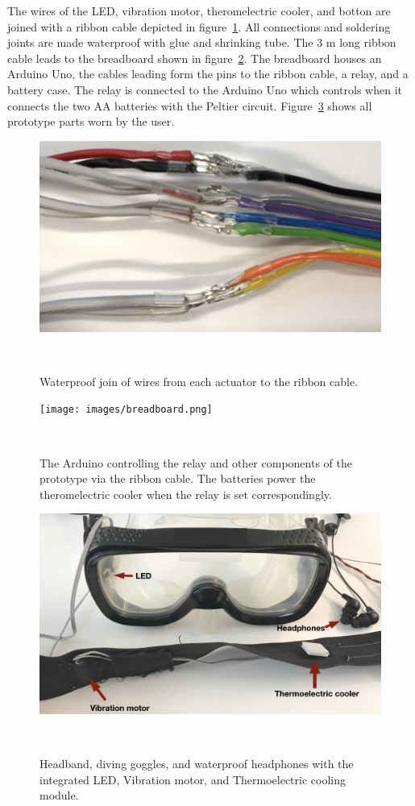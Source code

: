 The wires of the LED, vibration motor, theromelectric cooler, and botton are joined with a ribbon cable depicted in figure~\ref{fig:wires}.
All connections and soldering joints are made waterproof with glue and shrinking tube.
The  3 m long ribbon cable leads to the breadboard shown in figure~\ref{fig:breadboard}.
The breadboard houses an Arduino Uno, the cables leading form the pins to the ribbon cable, a relay, and a battery case.
The relay is connected to the Arduino Uno  which controls when it connects the two AA batteries with the Peltier circuit.
Figure~\ref{fig:studysetupcut} shows all prototype parts worn by the user.

\begin{figure}
	\includegraphics[width= \textwidth]{images/wires.png}
	\caption{Waterproof join of wires from each actuator to the ribbon cable.}~\label{fig:wires}
\end{figure}

\begin{figure}
	\texttt{[image: images/breadboard.png]}
	\caption{The Arduino controlling the relay and other components of the prototype via the ribbon cable. The batteries power the theromelectric cooler when the relay is set correspondingly.}~\label{fig:breadboard}
\end{figure}

 
\begin{figure}
	\includegraphics[width= \textwidth]{images/studysetupcut.png}
	\caption{Headband, diving goggles, and waterproof headphones with the integrated LED, Vibration motor, and Thermoelectric cooling module.}~\label{fig:studysetupcut}
\end{figure}


